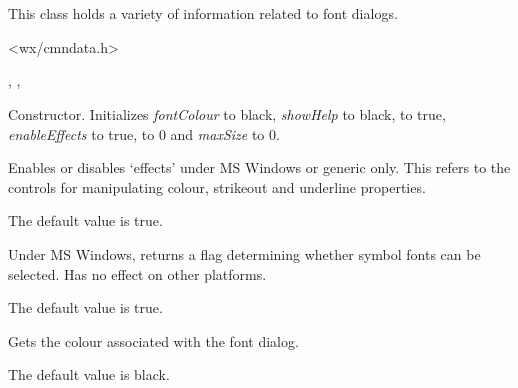 \section{}\label{wxfontdata}


This class holds a variety of information related to font dialogs.




<wx/cmndata.h>


, , 


\label{wxfontdatactor}


Constructor. Initializes {\it fontColour} to black, {\it showHelp} to black,
 to true, {\it enableEffects} to true,
 to 0 and {\it maxSize} to 0.

\label{wxfontdataenableeffects}


Enables or disables `effects' under MS Windows or generic only. This refers to the
controls for manipulating colour, strikeout and underline properties.

The default value is true.

\label{wxfontdatagetallowsymbols}


Under MS Windows, returns a flag determining whether symbol fonts can be selected. Has no
effect on other platforms.

The default value is true.

\label{wxfontdatagetcolour}


Gets the colour associated with the font dialog.

The default value is black.

